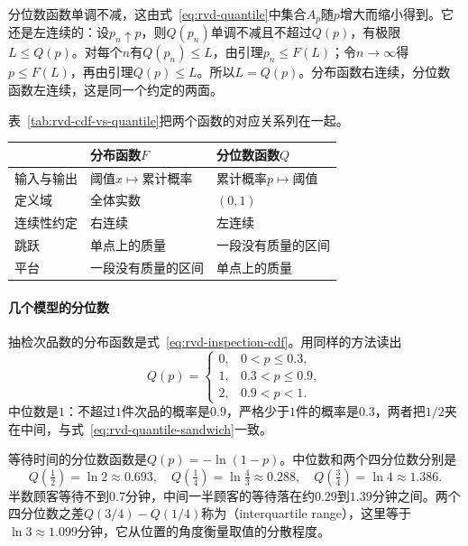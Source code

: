 分位数函数单调不减，这由式~\eqref{eq:rvd-quantile}中集合$A_p$随$p$增大而缩小得到。它还是左连续的：设$p_n\uparrow p$，则$Q(p_n)$单调不减且不超过$Q(p)$，有极限$L\leq Q(p)$。对每个$n$有$Q(p_n)\leq L$，由引理$p_n\leq F(L)$；令$n\to\infty$得$p\leq F(L)$，再由引理$Q(p)\leq L$。所以$L=Q(p)$。分布函数右连续，分位数函数左连续，这是同一个约定的两面。

表~\ref{tab:rvd-cdf-vs-quantile}把两个函数的对应关系列在一起。

\begin{BookInlineTable}
  \centering
  \begin{tabular}{lll}
    \toprule
    & 分布函数$F$ & 分位数函数$Q$\\
    \midrule
    输入与输出 & 阈值$x\mapsto$累计概率 & 累计概率$p\mapsto$阈值\\
    定义域 & 全体实数 & $(0,1)$\\
    连续性约定 & 右连续 & 左连续\\
    跳跃 & 单点上的质量 & 一段没有质量的区间\\
    平台 & 一段没有质量的区间 & 单点上的质量\\
    \bottomrule
  \end{tabular}
  \caption{分布函数与分位数函数的对应。二者由式~\eqref{eq:rvd-quantile-galois}联系，一方的跳跃对应另一方的平台。}
  \label{tab:rvd-cdf-vs-quantile}
\end{BookInlineTable}

\paragraph{几个模型的分位数}
抽检次品数的分布函数是式~\eqref{eq:rvd-inspection-cdf}。用同样的方法读出
\[
  Q(p)=\begin{cases}0,&0<p\leq0.3,\\1,&0.3<p\leq0.9,\\2,&0.9<p<1.\end{cases}
\]
中位数是$1$：不超过$1$件次品的概率是$0.9$，严格少于$1$件的概率是$0.3$，两者把$1/2$夹在中间，与式~\eqref{eq:rvd-quantile-sandwich}一致。

等待时间的分位数函数是$Q(p)=-\ln(1-p)$。中位数和两个四分位数分别是
\[
  Q(\tfrac12)=\ln2\approx0.693,\quad Q(\tfrac14)=\ln\tfrac43\approx0.288,\quad Q(\tfrac34)=\ln4\approx1.386 .
\]
半数顾客等待不到$0.7$分钟，中间一半顾客的等待落在约$0.29$到$1.39$分钟之间。两个四分位数之差$Q(3/4)-Q(1/4)$称为（interquartile range），这里等于$\ln3\approx1.099$分钟，它从位置的角度衡量取值的分散程度。

